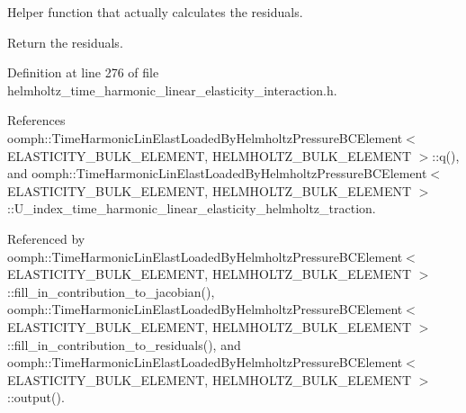 Helper function that actually calculates the residuals. 

Return the residuals. 

Definition at line 276 of file helmholtz\+\_\+time\+\_\+harmonic\+\_\+linear\+\_\+elasticity\+\_\+interaction.\+h.



References oomph\+::\+Time\+Harmonic\+Lin\+Elast\+Loaded\+By\+Helmholtz\+Pressure\+B\+C\+Element$<$ E\+L\+A\+S\+T\+I\+C\+I\+T\+Y\+\_\+\+B\+U\+L\+K\+\_\+\+E\+L\+E\+M\+E\+N\+T, H\+E\+L\+M\+H\+O\+L\+T\+Z\+\_\+\+B\+U\+L\+K\+\_\+\+E\+L\+E\+M\+E\+N\+T $>$\+::q(), and oomph\+::\+Time\+Harmonic\+Lin\+Elast\+Loaded\+By\+Helmholtz\+Pressure\+B\+C\+Element$<$ E\+L\+A\+S\+T\+I\+C\+I\+T\+Y\+\_\+\+B\+U\+L\+K\+\_\+\+E\+L\+E\+M\+E\+N\+T, H\+E\+L\+M\+H\+O\+L\+T\+Z\+\_\+\+B\+U\+L\+K\+\_\+\+E\+L\+E\+M\+E\+N\+T $>$\+::\+U\+\_\+index\+\_\+time\+\_\+harmonic\+\_\+linear\+\_\+elasticity\+\_\+helmholtz\+\_\+traction.



Referenced by oomph\+::\+Time\+Harmonic\+Lin\+Elast\+Loaded\+By\+Helmholtz\+Pressure\+B\+C\+Element$<$ E\+L\+A\+S\+T\+I\+C\+I\+T\+Y\+\_\+\+B\+U\+L\+K\+\_\+\+E\+L\+E\+M\+E\+N\+T, H\+E\+L\+M\+H\+O\+L\+T\+Z\+\_\+\+B\+U\+L\+K\+\_\+\+E\+L\+E\+M\+E\+N\+T $>$\+::fill\+\_\+in\+\_\+contribution\+\_\+to\+\_\+jacobian(), oomph\+::\+Time\+Harmonic\+Lin\+Elast\+Loaded\+By\+Helmholtz\+Pressure\+B\+C\+Element$<$ E\+L\+A\+S\+T\+I\+C\+I\+T\+Y\+\_\+\+B\+U\+L\+K\+\_\+\+E\+L\+E\+M\+E\+N\+T, H\+E\+L\+M\+H\+O\+L\+T\+Z\+\_\+\+B\+U\+L\+K\+\_\+\+E\+L\+E\+M\+E\+N\+T $>$\+::fill\+\_\+in\+\_\+contribution\+\_\+to\+\_\+residuals(), and oomph\+::\+Time\+Harmonic\+Lin\+Elast\+Loaded\+By\+Helmholtz\+Pressure\+B\+C\+Element$<$ E\+L\+A\+S\+T\+I\+C\+I\+T\+Y\+\_\+\+B\+U\+L\+K\+\_\+\+E\+L\+E\+M\+E\+N\+T, H\+E\+L\+M\+H\+O\+L\+T\+Z\+\_\+\+B\+U\+L\+K\+\_\+\+E\+L\+E\+M\+E\+N\+T $>$\+::output().

\mbox{\label{classoomph_1_1TimeHarmonicLinElastLoadedByHelmholtzPressureBCElement_a1ecf56e825d5af950572efe4208ad307}} 
